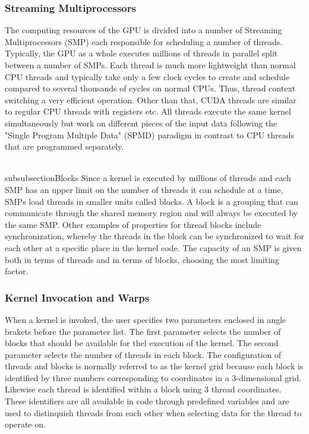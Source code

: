 \subsubsection{Streaming Multiprocessors}
The computing resources of the GPU is divided into a number of Streaming Multiprocessors (SMP) each responsible for scheduling a number of threads. Typically, the GPU as a whole executes millions of threads in parallel split between a number of SMPs. Each thread is much more lightweight than normal CPU threads and typically take only a few clock cycles to create and schedule compared to several thousands of cycles on normal CPUs. Thus, thread context switching a very efficient operation. Other than that, CUDA threads are similar to regular CPU threads with registers etc. All threads execute the same kernel simultaneously but work on different pieces of the input data following the "Single Program Multiple Data" (SPMD) paradigm in contrast to CPU threads that are programmed separately. 

\\subsubsection{Blocks}
Since a kernel is executed by millions of threads and each SMP has an upper limit on the number of threads it can schedule at a time, SMPs load threads in smaller units called blocks. A block is a grouping that can communicate through the shared memory region and will always be executed by the same SMP. Other examples of properties for thread blocks include synchronization, whereby the threads in the block can be synchronized to wait for each other at a specific place in the kernel code. The capacity of an SMP is given both in terms of threads and in terms of blocks, choosing the most limiting factor.

\subsubsection{Kernel Invocation and Warps}
When a kernel is invoked, the user specifies two parameters enclosed in angle brakets before the parameter list. The first parameter selects the number of blocks that should be available for thel execution of the kernel. The second parameter selects the number of threads in each block. The configuration of threads and blocks is normally referred to as the kernel grid because each block is identified by three numbers corresponding to coordinates in a 3-dimensional grid. Likewise each thread is identified within a block using 3 thread coordinates. These identifiers are all available in code through predefined variables and are used to distinquish threads from each other when selecting data for the thread to operate on.

